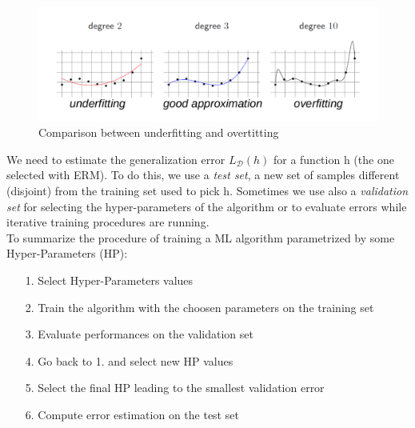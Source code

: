 \documentclass[12pt]{report}
\theoremstyle{plain}
\newcommand\mcl[1]{\mathcal{#1}}
\begin{document}
\begin{flushleft}
\begin{figure}[!h]
	\centering
	\includegraphics[scale=0.7]{images/over_under_fitting.pdf}
	\caption{Comparison between underfitting and overtitting}
	\label{fig:under_over_fit}
\end{figure}

\vspace{0.5cm}
We need to estimate the generalization error $L_\mcl{D}(h)$ for a function h (the one selected with ERM). To do this, we use a \textit{test set}, a new set of samples different (disjoint) from the training set used to pick h. Sometimes we use also a \textit{validation set} for selecting the hyper-parameters of the algorithm or to evaluate errors while iterative training procedures are running.\\
To summarize the procedure of training a ML algorithm parametrized by some Hyper-Parameters (HP):
\begin{itemize}
	\item[1.] Select Hyper-Parameters values
	\item[2.] Train the algorithm with the choosen parameters on the training set
	\item[3.] Evaluate performances on the validation set
	\item[4.] Go back to 1. and select new HP values
	\item[5.] Select the final HP leading to the smallest validation error
	\item[6.] Compute error estimation on the test set  
\end{itemize}



\end{flushleft}
\end{document}
